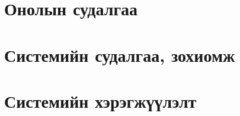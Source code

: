 \chapter{Онолын судалгаа}

\chapter{Системийн судалгаа, зохиомж}

\chapter{Системийн хэрэгжүүлэлт}

% 
